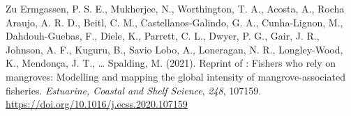 \documentclass[
  12pt,
]{article}
\newlength{\cslhangindent}
\newlength{\cslentryspacingunit} %
\newenvironment{CSLReferences}[2] %
 {%
  \setlength{\parindent}{0pt}
  \ifodd #1
  \let\oldpar\par
  \def\par{\hangindent=\cslhangindent\oldpar}
  \fi
  \setlength{\parskip}{#2\cslentryspacingunit}
 }%
 {}
\begin{document}
\begin{CSLReferences}{1}{2}
\leavevmode{}%
Zu Ermgassen, P. S. E., Mukherjee, N., Worthington, T. A., Acosta, A., Rocha Araujo, A. R. D., Beitl, C. M., Castellanos-Galindo, G. A., Cunha-Lignon, M., Dahdouh-Guebas, F., Diele, K., Parrett, C. L., Dwyer, P. G., Gair, J. R., Johnson, A. F., Kuguru, B., Savio Lobo, A., Loneragan, N. R., Longley-Wood, K., Mendonça, J. T., \ldots{} Spalding, M. (2021). Reprint of : {Fishers} who rely on mangroves: {Modelling} and mapping the global intensity of mangrove-associated fisheries. \emph{Estuarine, Coastal and Shelf Science}, \emph{248}, 107159. \url{https://doi.org/10.1016/j.ecss.2020.107159}

\end{CSLReferences}
\end{document}
